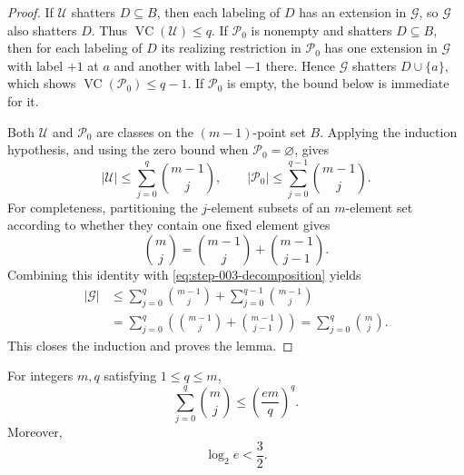 \begin{proof}
If $\mathcal U$ shatters $D\subseteq B$, then each labeling of $D$ has an
extension in $\mathcal G$, so $\mathcal G$ also shatters $D$.  Thus
$\operatorname{VC}(\mathcal U)\leq q$.  If $\mathcal P_0$ is nonempty and
shatters $D\subseteq B$, then for each labeling of $D$ its realizing
restriction in $\mathcal P_0$ has one extension in $\mathcal G$ with label
$+1$ at $a$ and another with label $-1$ there.  Hence $\mathcal G$ shatters
$D\cup\{a\}$, which shows $\operatorname{VC}(\mathcal P_0)\leq q-1$.  If
$\mathcal P_0$ is empty, the bound below is immediate for it.

Both $\mathcal U$ and $\mathcal P_0$ are classes on the $(m-1)$-point set
$B$.  Applying the induction hypothesis, and using the zero bound when
$\mathcal P_0=\varnothing$, gives
\[
|\mathcal U|\leq\sum_{j=0}^{q}\binom{m-1}{j},
\qquad
|\mathcal P_0|\leq\sum_{j=0}^{q-1}\binom{m-1}{j}.
\]
For completeness, partitioning the $j$-element subsets of an $m$-element set
according to whether they contain one fixed element gives
\[
\binom mj=\binom{m-1}{j}+\binom{m-1}{j-1}.
\]
Combining this identity with \eqref{eq:step-003-decomposition} yields
\[
\begin{aligned}
|\mathcal G|
&\leq\sum_{j=0}^{q}\binom{m-1}{j}
+\sum_{j=0}^{q-1}\binom{m-1}{j}\\
&=\sum_{j=0}^{q}
\left(\binom{m-1}{j}+\binom{m-1}{j-1}\right)
=\sum_{j=0}^{q}\binom mj.
\end{aligned}
\]
This closes the induction and proves the lemma.
\end{proof}

\begin{lemma}
\label{lem:step-003-binomial}
For integers $m,q$ satisfying $1\leq q\leq m$,
\[
\sum_{j=0}^{q}\binom mj\leq\left(\frac{em}{q}\right)^q.
\]
Moreover,
\[
\log_2 e<\frac32.
\]
\end{lemma}

